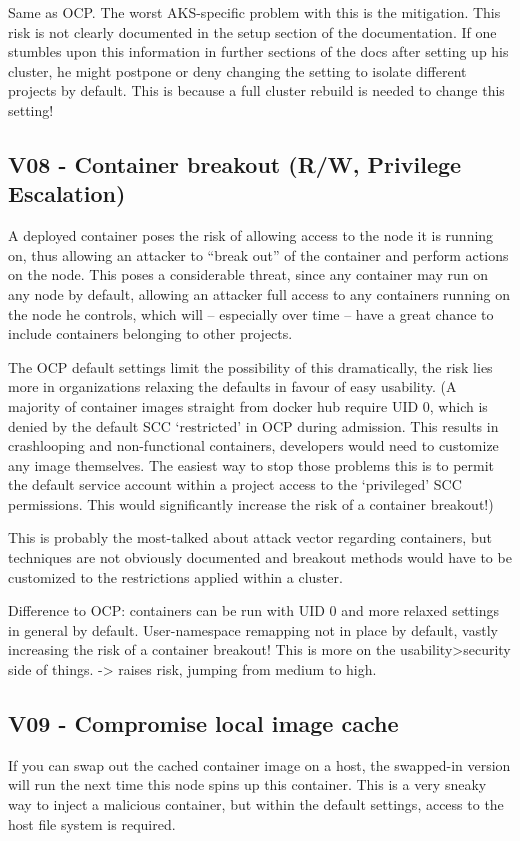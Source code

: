 Same as OCP. 
The worst AKS-specific problem with this is the mitigation. This risk is not clearly documented in the setup section of the documentation. If one stumbles upon this information in further sections of the docs after setting up his cluster, he might postpone or deny changing the setting to isolate different projects by default. This is because a full cluster rebuild is needed to change this setting!

\subsection{V08 - Container breakout (R/W, Privilege Escalation)}
A deployed container poses the risk of allowing access to the node it is running on, thus allowing an attacker to “break out” of the container and perform actions on the node.
This poses a considerable threat, since any container may run on any node by default, allowing an attacker full access to any containers running on the node he controls, which will – especially over time – have a great chance to include containers belonging to other projects.

The OCP default settings limit the possibility of this dramatically, the risk lies more in organizations relaxing the defaults in favour of easy usability. (A majority of container images straight from docker hub require UID 0, which is denied by the default SCC ‘restricted’ in OCP during admission. This results in crashlooping and non-functional containers, developers would need to customize any image themselves. The easiest way to stop those problems this is to permit the default service account within a project access to the ‘privileged’ SCC permissions. This would significantly increase the risk of a container breakout!)

This is probably the most-talked about attack vector regarding containers, but techniques are not obviously documented and breakout methods would have to be customized to the restrictions applied within a cluster.

Difference to OCP: containers can be run with UID 0 and more relaxed settings in general by default. User-namespace remapping not in place by default, vastly increasing the risk of a container breakout!
This is more on the usability>security side of things. 
-> raises risk, jumping from medium to high.


\subsection{V09 - Compromise local image cache}
If you can swap out the cached container image on a host, the swapped-in version will run the next time this node spins up this container.
This is a very sneaky way to inject a malicious container, but within the default settings, access to the host file system is required.

